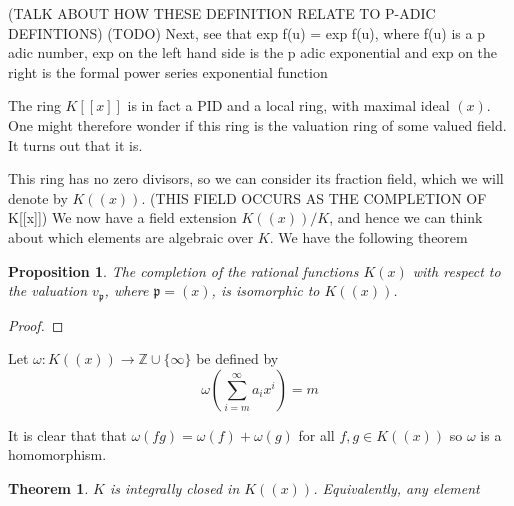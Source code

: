 \documentclass{article}
\newtheorem{theorem}{Theorem}[section]
\newtheorem{proposition}{Proposition}[section]
\newcommand{\mfrak}[1]{\mathfrak{#1}}
\newcommand{\mbb}[1]{\mathbb{#1}}
\begin{document}
(TALK ABOUT HOW THESE DEFINITION RELATE TO P-ADIC DEFINTIONS)
(TODO)
Next, see that exp f(u) = exp f(u), where f(u) is a p adic number, exp on the left hand side is the p adic exponential and exp on the right is the formal power series exponential function 



The ring $K[[x]]$ is in fact a PID and a local ring, with maximal ideal $(x)$. One might therefore wonder if this ring is the valuation ring of some valued field. It turns out that it is. 

This ring has no zero divisors, so we can consider its fraction field, which we will denote by $K((x))$. (THIS FIELD OCCURS AS THE COMPLETION OF K[[x]]) We now have a field extension $K((x)) / K$, and hence we can think about which elements are algebraic over $K$. We have the following theorem


\begin{proposition}
    The completion of the rational functions $K(x)$ with respect to the valuation $v_\mfrak{p}$, where $\mfrak p = (x)$, is isomorphic to $K((x))$.  
\end{proposition}

\begin{proof}

\end{proof}


Let $\omega : K((x)) \to \mbb Z \cup \{\infty\} $ be defined by
$$\omega(\sum_{i = m}^\infty a_i x^i)  = m$$

It is clear that that $\omega(f g) = \omega(f) + \omega(g)$ for all $f,g \in K((x))$ so $\omega$ is a homomorphism.

\begin{theorem}
    $K$ is integrally closed in $K((x))$. Equivalently, any element 
\end{theorem}
\end{document}
